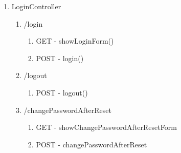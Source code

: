 \documentclass[12pt,DIV14,BCOR10mm,a4paper,twoside,parskip=half-,headsepline,headinclude,english,ngerman,bibliography=totocnumbered]{scrreprt}
\begin{document}
\begin{enumerate}
\begin{enumerate}
    \item LoginController
    \begin{enumerate}
      \item /login
      \begin{enumerate}
        \item GET - showLoginForm()
        \item POST - login()
      \end{enumerate} 
      \item /logout
      \begin{enumerate}
        \item POST - logout()
      \end{enumerate} 
      \item /changePasswordAfterReset
      \begin{enumerate}
        \item GET - showChangePasswordAfterResetForm
        \item POST - changePasswordAfterReset
      \end{enumerate}
    \end{enumerate}
    

\end{enumerate}
\end{enumerate}
\end{document}
